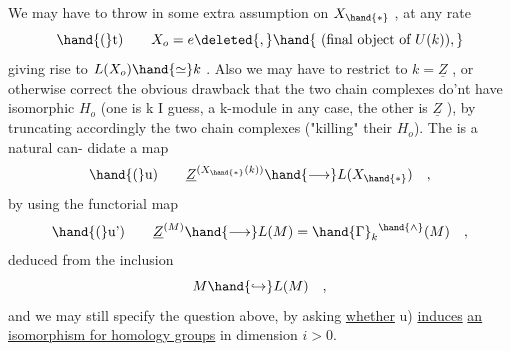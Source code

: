 We may have to throw in some extra assumption on $X_{\hand{*}}$ , at any rate
\[ \hand{(}\text{t)} \qquad X_o = e \deleted{,} \hand{\text{ (final object of }U(k)),} \]
 giving rise to  $L(X_o)\hand{\simeq} k$ . Also we may
have to restrict to $k=\underline{Z}$ , or otherwise correct the obvious drawback that
the two chain complexes do'nt have isomorphic $H_o$ (one is k I guess,
a k-module in any case, the other is $\underline{Z}$ ), by truncating accordingly
the two chain complexes ("killing" their $H_o$). The is a natural can-%
didate  a map
\[ \hand{(}\text{u)} \qquad \underline{Z}^{(X_{\hand{*}}(k))} \hand{\longrightarrow} L(X_{\hand{*}}) \quad , \]
by using the functorial map
\[ \hand{(}\text{u')} \qquad \underline{Z}^{(M)} \hand{\longrightarrow} L(M) = \hand{\Gamma}_k{}^{\hand{\wedge}}(M) \quad , \]
deduced from the inclusion 
\[ M \hand{\hookrightarrow} L(M) \quad , \]
and we may still specify the question above, by asking \uline{whether} \hand{(}u) \uline{induces}
\uline{an isomorphism for homology groups} in dimension $i>0$.


